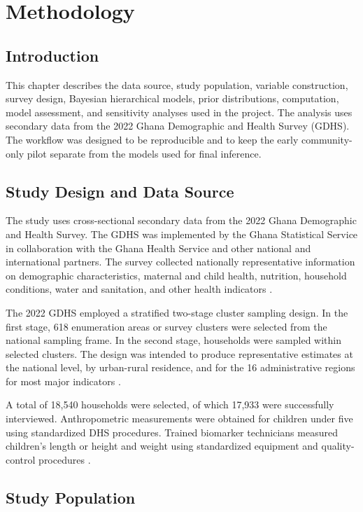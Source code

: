 \chapter{Methodology}
\label{chap:methodology}

\section{Introduction}

This chapter describes the data source, study population, variable construction, survey design, Bayesian hierarchical models, prior distributions, computation, model assessment, and sensitivity analyses used in the project. The analysis uses secondary data from the 2022 Ghana Demographic and Health Survey (GDHS). The workflow was designed to be reproducible and to keep the early community-only pilot separate from the models used for final inference.

\section{Study Design and Data Source}

The study uses cross-sectional secondary data from the 2022 Ghana Demographic and Health Survey. The GDHS was implemented by the Ghana Statistical Service in collaboration with the Ghana Health Service and other national and international partners. The survey collected nationally representative information on demographic characteristics, maternal and child health, nutrition, household conditions, water and sanitation, and other health indicators \cite{GSSICF2024}.

The 2022 GDHS employed a stratified two-stage cluster sampling design. In the first stage, 618 enumeration areas or survey clusters were selected from the national sampling frame. In the second stage, households were sampled within selected clusters. The design was intended to produce representative estimates at the national level, by urban-rural residence, and for the 16 administrative regions for most major indicators \cite{GSSICF2024}.

A total of 18,540 households were selected, of which 17,933 were successfully interviewed. Anthropometric measurements were obtained for children under five using standardized DHS procedures. Trained biomarker technicians measured children's length or height and weight using standardized equipment and quality-control procedures \cite{GSSICF2024}.

\section{Study Population}

